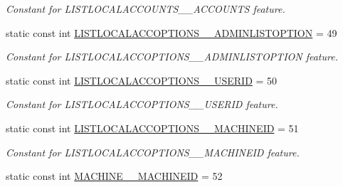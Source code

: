 \begin{DoxyCompactItemize}
\begin{DoxyCompactList}\small\item\em Constant for LISTLOCALACCOUNTS\_\-\_\-ACCOUNTS feature. \item\end{DoxyCompactList}\item 
\hypertarget{classUMS__Data_1_1UMS__DataPackage_a435a77183bfb44241627cc3868309380}{
static const int \hyperlink{classUMS__Data_1_1UMS__DataPackage_a435a77183bfb44241627cc3868309380}{LISTLOCALACCOPTIONS\_\-\_\-ADMINLISTOPTION} = 49}
\label{classUMS__Data_1_1UMS__DataPackage_a435a77183bfb44241627cc3868309380}

\begin{DoxyCompactList}\small\item\em Constant for LISTLOCALACCOPTIONS\_\-\_\-ADMINLISTOPTION feature. \item\end{DoxyCompactList}\item 
\hypertarget{classUMS__Data_1_1UMS__DataPackage_a7b3a97e110c0796d0b4b5832654211f1}{
static const int \hyperlink{classUMS__Data_1_1UMS__DataPackage_a7b3a97e110c0796d0b4b5832654211f1}{LISTLOCALACCOPTIONS\_\-\_\-USERID} = 50}
\label{classUMS__Data_1_1UMS__DataPackage_a7b3a97e110c0796d0b4b5832654211f1}

\begin{DoxyCompactList}\small\item\em Constant for LISTLOCALACCOPTIONS\_\-\_\-USERID feature. \item\end{DoxyCompactList}\item 
\hypertarget{classUMS__Data_1_1UMS__DataPackage_a14c53393be5791f913ec6a7c7ff2dcdd}{
static const int \hyperlink{classUMS__Data_1_1UMS__DataPackage_a14c53393be5791f913ec6a7c7ff2dcdd}{LISTLOCALACCOPTIONS\_\-\_\-MACHINEID} = 51}
\label{classUMS__Data_1_1UMS__DataPackage_a14c53393be5791f913ec6a7c7ff2dcdd}

\begin{DoxyCompactList}\small\item\em Constant for LISTLOCALACCOPTIONS\_\-\_\-MACHINEID feature. \item\end{DoxyCompactList}\item 
\hypertarget{classUMS__Data_1_1UMS__DataPackage_a250bdefa3219fb57001d1557884f0e1f}{
static const int \hyperlink{classUMS__Data_1_1UMS__DataPackage_a250bdefa3219fb57001d1557884f0e1f}{MACHINE\_\-\_\-MACHINEID} = 52}
\label{classUMS__Data_1_1UMS__DataPackage_a250bdefa3219fb57001d1557884f0e1f}


\end{DoxyCompactItemize}
